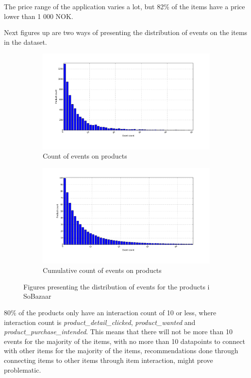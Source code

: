         The price range of the application varies a lot, but 82\% of the items have a price lower than 1 000 NOK.

        Next figures up are two ways of presenting the distribution of events on the items in the dataset.

    \begin{figure}[H]
        \centering
        \begin{subfigure}{.5\textwidth}
            \includegraphics[width=\dualGraphWidth]{image/product_iddistribution.png}
            \centering
            \caption{Count of events on products}
    \label{figure:eventsPerproduct}
        \end{subfigure}%
        \begin{subfigure}{.5\textwidth}
            \includegraphics[width=\dualGraphWidth]{image/product_idcumdistribution.png}
            \centering
            \caption{Cumulative count of events on products}
    \label{figure:eventsPerproductCum}
        \end{subfigure}
        \caption{Figures presenting the distribution of events for the products i SoBazaar}
    \end{figure}
        80\% of the products only have an interaction count of 10 or less, where interaction count is \emph{product\_detail\_clicked}, \emph{product\_wanted} and \emph{product\_purchase\_intended}.
        This means that there will not be more than 10 events for the majority of the items, with no more than 10 datapoints to connect with other items for the majority of the items, recommendations done through connecting items to other items through item interaction, might prove problematic.

